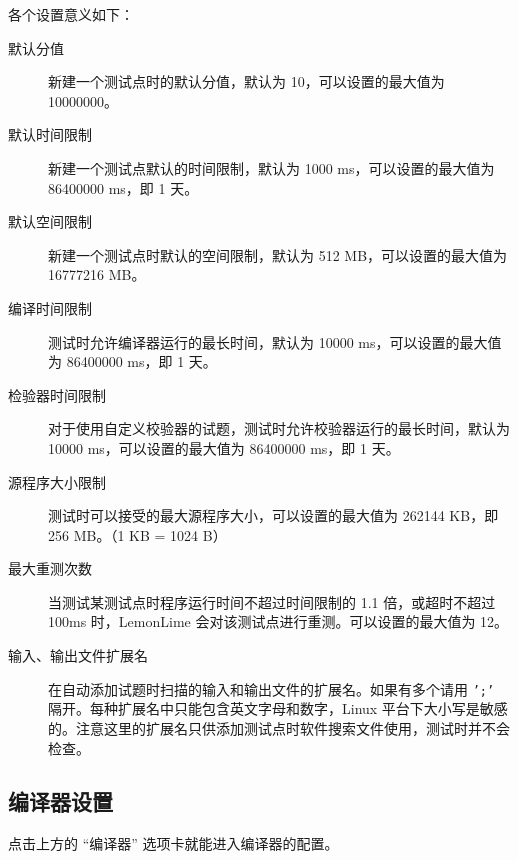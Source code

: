 \documentclass[UTF-8]{ctexart}
\begin{document}
				各个设置意义如下：
				
				\begin{description}
					\item[默认分值] 新建一个测试点时的默认分值，默认为 10，可以设置的最大值为 10000000。
					\item[默认时间限制] 新建一个测试点默认的时间限制，默认为 1000 ms，可以设置的最大值为 86400000 ms，即 1 天。
					\item[默认空间限制] 新建一个测试点时默认的空间限制，默认为 512 MB，可以设置的最大值为 16777216 MB。
					\item[编译时间限制] 测试时允许编译器运行的最长时间，默认为 10000 ms，可以设置的最大值为 86400000 ms，即 1 天。
					\item[检验器时间限制] 对于使用自定义校验器的试题，测试时允许校验器运行的最长时间，默认为 10000 ms，可以设置的最大值为 86400000 ms，即 1 天。
					\item[源程序大小限制] 测试时可以接受的最大源程序大小，可以设置的最大值为 262144 KB，即 256 MB。（1 KB = 1024 B）
					\item[最大重测次数] 当测试某测试点时程序运行时间不超过时间限制的 1.1 倍，或超时不超过 100ms 时，LemonLime 会对该测试点进行重测。可以设置的最大值为 12。
					\item[输入、输出文件扩展名]  在自动添加试题时扫描的输入和输出文件的扩展名。如果有多个请用 \texttt{';'} 隔开。每种扩展名中只能包含英文字母和数字，Linux 平台下大小写是敏感的。注意这里的扩展名只供添加测试点时软件搜索文件使用，测试时并不会检查。
				\end{description}
		
			\subsection{编译器设置}
			
				点击上方的 “编译器” 选项卡就能进入编译器的配置。
				
\end{document}
